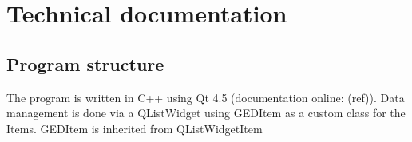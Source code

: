 \section{Technical documentation}
\subsection{Program structure}
The program is written in C++ using Qt 4.5 (documentation online: (ref)). Data management is done via a QListWidget using GEDItem as a custom class for the Items. GEDItem is inherited from QListWidgetItem 
